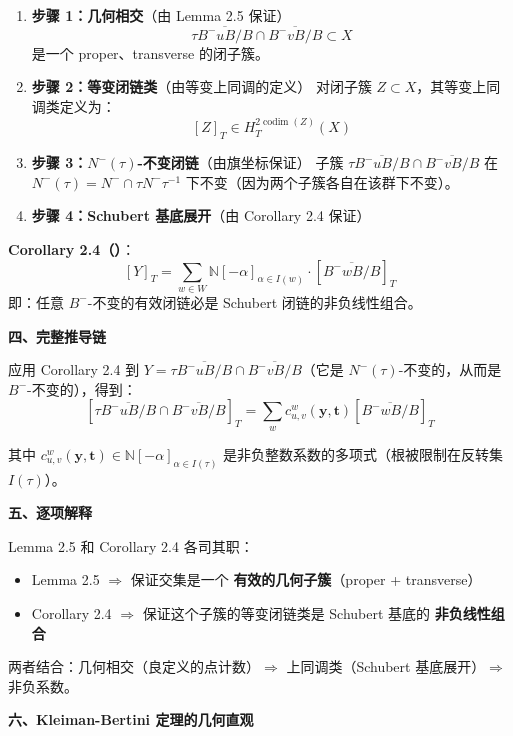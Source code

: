 \begin{enumerate}
\item \textbf{步骤 1：几何相交}（由 Lemma 2.5 保证）
$$\tau \overline{B^-uB/B} \cap \overline{B^-vB/B} \subset X$$
是一个 proper、transverse 的闭子簇。

\item \textbf{步骤 2：等变闭链类}（由等变上同调的定义）
对闭子簇 $Z \subset X$，其等变上同调类定义为：
$$[Z]_T \in H_T^{2\operatorname{codim}(Z)}(X)$$

\item \textbf{步骤 3：$N^-(\tau)$-不变闭链}（由旗坐标保证）
子簇 $\tau \overline{B^-uB/B} \cap \overline{B^-vB/B}$ 在 $N^-(\tau) = N^- \cap \tau N^- \tau^{-1}$ 下不变（因为两个子簇各自在该群下不变）。

\item \textbf{步骤 4：Schubert 基底展开}（由 Corollary 2.4 保证）
\end{enumerate}

\textbf{Corollary 2.4（\cite[ Corollary 2.4]{GX2025}）}：
$$[Y]_T = \sum_{w \in W} \mathbb{N}[-\alpha]_{\alpha \in I(w)} \cdot [\overline{B^-wB/B}]_T$$
即：任意 $B^-$-不变的有效闭链必是 Schubert 闭链的非负线性组合。

\textbf{四、完整推导链}

应用 Corollary 2.4 到 $Y = \tau \overline{B^-uB/B} \cap \overline{B^-vB/B}$（它是 $N^-(\tau)$-不变的，从而是 $B^-$-不变的），得到：
$$[\tau \overline{B^-uB/B} \cap \overline{B^-vB/B}]_T = \sum_w c_{u,v}^w(\mathbf{y},\mathbf{t})[\overline{B^-wB/B}]_T$$

其中 $c_{u,v}^w(\mathbf{y},\mathbf{t}) \in \mathbb{N}[-\alpha]_{\alpha \in I(\tau)}$ 是非负整数系数的多项式（根被限制在反转集 $I(\tau)$）。

\textbf{五、逐项解释}

Lemma 2.5 和 Corollary 2.4 各司其职：

\begin{itemize}
\item Lemma 2.5 $\Rightarrow$ 保证交集是一个 \textbf{有效的几何子簇}（proper + transverse）
\item Corollary 2.4 $\Rightarrow$ 保证这个子簇的等变闭链类是 Schubert 基底的 \textbf{非负线性组合}
\end{itemize}

两者结合：几何相交（良定义的点计数）$\Longrightarrow$ 上同调类（Schubert 基底展开）$\Longrightarrow$ 非负系数。

\textbf{六、Kleiman-Bertini 定理的几何直观}

